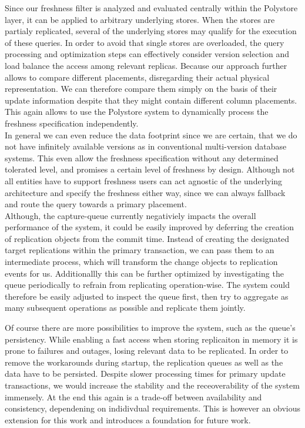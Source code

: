 Since our freshness filter is analyzed and evaluated centrally within the Polystore layer, it can be applied to arbitrary underlying stores.
When the stores are partialy replicated, several of the underlying stores may qualify for the execution of these queries. 
In order to avoid that single stores are overloaded, the query processing and optimization steps
can effectively consider version selection and load balance the access among relevant replicas.
Because our approach further allows to compare different placements, disregarding their actual physical representation. We can therefore compare them simply on the basis of their
update information despite that they might contain different column placements. 
This again allows to use the Polystore system to dynamically process the freshness specification independently.\\
In general we can even reduce the data footprint since we are certain, that we do not have infinitely available versions as in conventional multi-version database systems.
This even allow the freshness specification without any determined tolerated level, and promises a certain level of freshness by design.
Although not all entities have to support freshness users can act agnostic of the underlying architecture and specify the freshness either way, 
since we can always fallback and route the query towards a primary placement.\\







Although, the capture-queue currently negativiely impacts the overall performance of the system,
it could be easily improved by deferring the creation of replication objects from the commit time.
Instead of creating the designated target replications within the primary transaction, we can pass them to an intermediate process, 
which will transform the change objects to replication events for us.
Additionallly this can be further optimized by investigating the queue periodically to refrain from replicating operation-wise.
The system could therefore be easily adjusted to inspect the queue first, then try to aggregate as many subsequent operations as possible
and replicate them jointly.



Of course there are more possibilities to improve the system, such as the queue's persistency. While enabling a fast access when storing replicaiton in memory it is prone to 
failures and outages, losing relevant data to be replicated. In order to remove the workarounds during startup, the replication queues as well as the data have 
to be persisted. Despite slower processing times for primary update transactions, we would increase the stability and the receoverability of the system immensely.
At the end this again is a trade-off between availability and consistency, dependening on indidivdual requirements.
This is however an obvious extension for this work and introduces a foundation for future work.


